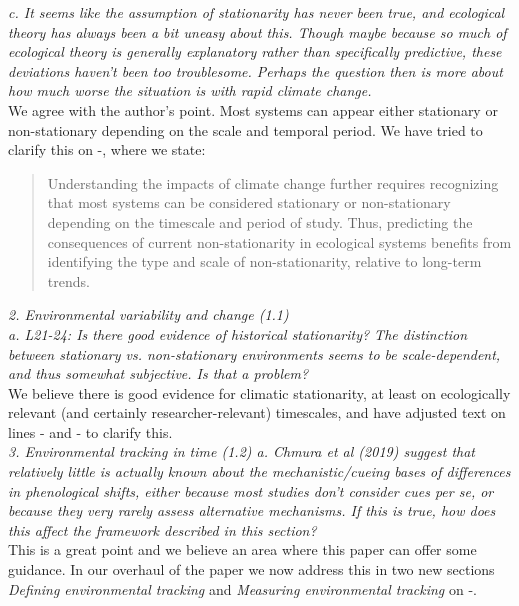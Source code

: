 \documentclass[11pt]{article}
\begin{document}
\emph{c.      It seems like the assumption of stationarity has never been true, and ecological
theory has always been a bit uneasy about this. Though maybe because so much of ecological
theory is generally explanatory rather than specifically predictive, these deviations haven't
been too troublesome. Perhaps the question then is more about how much worse the situation is
with rapid climate change.}\\

We agree with the author's point. Most systems can appear either stationary or non-stationary depending on the scale and temporal period. We have tried to clarify this on -, where we state:
\begin{quote}
Understanding the impacts of climate change further requires recognizing that most systems can be considered stationary or non-stationary depending on the timescale and period of study. Thus, predicting the consequences of current non-stationarity in ecological systems benefits from identifying the type and scale of non-stationarity, relative to long-term trends.
\end{quote}

\emph{2.      Environmental variability and change (1.1)\\
a.      L21-24: Is there good evidence of historical stationarity? The distinction between
stationary vs. non-stationary environments seems to be scale-dependent, and thus somewhat
subjective. Is that a problem?}\\

We believe there is good evidence for climatic stationarity, at least on ecologically relevant (and certainly researcher-relevant) timescales, and have adjusted text on lines - and - to clarify this. \\

\emph{3.      Environmental tracking in time (1.2)
a.      Chmura et al (2019) suggest that relatively little is actually known about the
mechanistic/cueing bases of differences in phenological shifts, either because most studies
don't consider cues per se, or because they very rarely assess alternative mechanisms. If
this is true, how does this affect the framework described in this section?}\\

This is a great point and we believe an area where this paper can offer some guidance. In our overhaul of the paper we now address this in two new sections \emph{Defining environmental tracking} and \emph{Measuring environmental tracking} on -.\\
\end{document}
